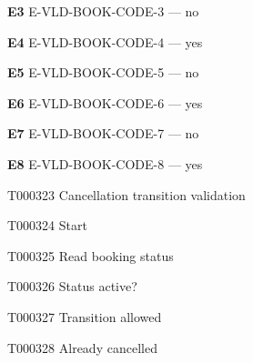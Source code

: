 \documentclass[11pt,a4paper]{article}
\begin{document}
\noindent\textbf{E3} E-VLD-BOOK-CODE-3 --- no\par
\noindent\textbf{E4} E-VLD-BOOK-CODE-4 --- yes\par
\noindent\textbf{E5} E-VLD-BOOK-CODE-5 --- no\par
\noindent\textbf{E6} E-VLD-BOOK-CODE-6 --- yes\par
\noindent\textbf{E7} E-VLD-BOOK-CODE-7 --- no\par
\noindent\textbf{E8} E-VLD-BOOK-CODE-8 --- yes\par
\endgroup
\clearpage
\begin{atlastext}{T000323}
Cancellation transition validation
\end{atlastext}
\begin{atlastext}{T000324}
Start
\end{atlastext}
\begin{atlastext}{T000325}
Read booking status
\end{atlastext}
\begin{atlastext}{T000326}
Status active?
\end{atlastext}
\begin{atlastext}{T000327}
Transition allowed
\end{atlastext}
\begin{atlastext}{T000328}
Already cancelled
\end{atlastext}
\end{document}
